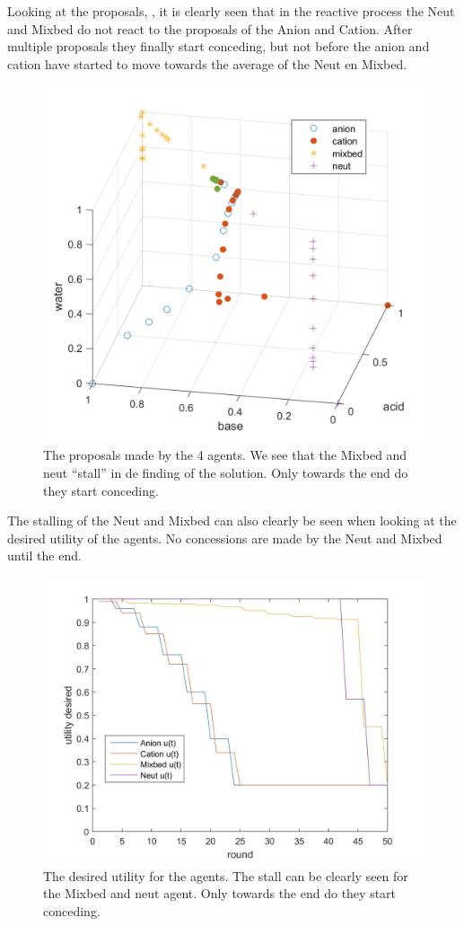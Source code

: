 Looking at the proposals, , it is clearly seen that in the reactive process the Neut and Mixbed do not react to the proposals of the Anion and Cation. After multiple proposals they finally start conceding, but not before the anion and cation have started to move towards the average of the Neut en Mixbed. 

\begin{figure}[h]
	\centering
	\includegraphics[width=0.7\linewidth]{img/reactive_4_plot}
	\caption{The proposals made by the 4 agents. We see that the Mixbed and neut ``stall'' in de finding of the solution. Only towards the end do they start conceding.}
	\label{fig:reactive4plot}
\end{figure}

The stalling of the Neut and Mixbed can also clearly be seen when looking at the desired utility of the agents. No concessions are made by the Neut and Mixbed until the end.

\begin{figure}[h]
	\centering
	\includegraphics[width=0.7\linewidth]{img/desiredutility_reactive_4}
	\caption{The desired utility for the agents. The stall can be clearly seen for the Mixbed and neut agent. Only towards the end do they start conceding.}
	\label{fig:desiredutilityreactive4}
\end{figure}



